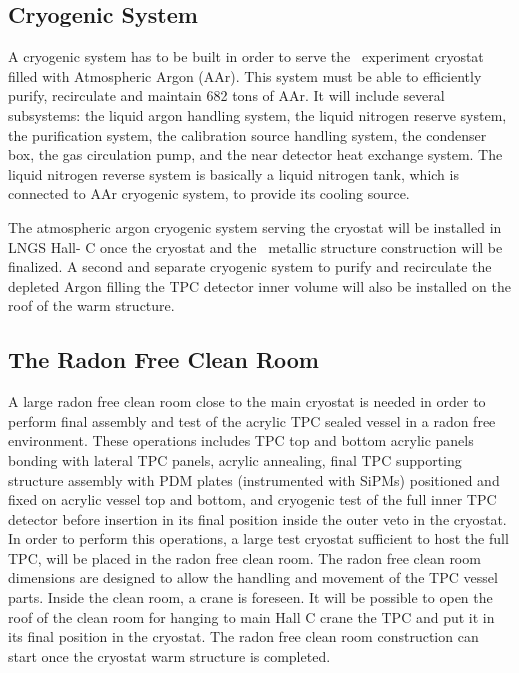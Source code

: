 \subsection{Cryogenic System}
\label{sec:CryogenicSystem}

A cryogenic system has to be built in order to serve the \DSks\ experiment cryostat
filled with Atmospheric Argon (AAr). This system must be able to efficiently purify,
recirculate and maintain 682 tons of AAr. It will include several subsystems: the liquid argon
handling system, the liquid nitrogen reserve system, the purification system, the calibration
source handling system, the condenser box, the gas circulation pump, and the near detector
heat exchange system.
The liquid nitrogen reverse system is basically a liquid nitrogen tank, which is connected to
AAr cryogenic system, to provide its cooling source.

The atmospheric argon cryogenic system serving the cryostat will be installed in LNGS Hall-
C once the cryostat and the \DSks\ metallic structure construction will be finalized. A
second and separate cryogenic system to purify and recirculate the depleted Argon filling the
TPC detector inner volume will also be installed on the roof of the warm structure.

\subsection{The Radon Free Clean Room}
\label{sec:RadonFreeCleanRoom}

A large radon free clean room close to the main cryostat is needed in order to perform final
assembly and test of the acrylic TPC sealed vessel in a radon free environment. These
operations includes TPC top and bottom acrylic panels bonding with lateral TPC panels,
acrylic annealing, final TPC supporting structure assembly with PDM plates (instrumented
with SiPMs) positioned and fixed on acrylic vessel top and bottom, and cryogenic test of the
full inner TPC detector before insertion in its final position inside the outer veto in the
cryostat. In order to perform this operations, a large test cryostat sufficient to host the full
TPC, will be placed in the radon free clean room. The radon free clean room dimensions are
designed to allow the handling and movement of the TPC vessel parts. Inside the clean room,
a crane is foreseen. It will be possible to open the roof of the clean room for hanging to main
Hall C crane the TPC and put it in its final position in the cryostat. The radon free clean room
construction can start once the cryostat warm structure is completed.

